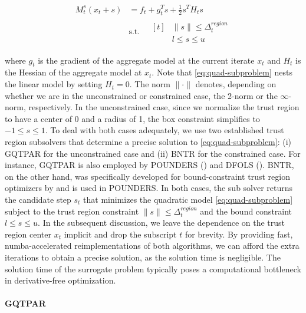 \begin{align}
    M_{t}^{s} (x_t + s) &= f_t + g_t^T s + \frac{1}{2} s^T H_t s \\
    &\text{s.t.} \quad \begin{aligned}[t]
        &\lVert s \rVert \leq \Delta^{region}_{t} \\
        & l \leq s \leq u
    \end{aligned}
    \label{eq:quad-subproblem}
\end{align}


\noindent where $g_t$ is the gradient of the aggregate model at the current iterate $x_t$ and $H_t$ is the Hessian of the aggregate model at $x_t$.
Note that \ref{eq:quad-subproblem} nests the linear model by setting $H_t=0$.
The norm $\lVert\cdot\rVert$ denotes, depending on whether we are in the unconstrained or constrained case, the 2-norm or the $\infty$-norm, respectively. In the unconstrained case, since we normalize the trust region to have a center of 0 and a radius of 1, the box constraint simplifies to $-1 \leq s \leq 1$.
To deal with both cases adequately, we use two established trust region subsolvers that determine a precise solution to \ref{eq:quad-subproblem}: (i) GQTPAR for the unconstrained case and (ii) BNTR for the constrained case. For instance, GQTPAR is also employed by POUNDERS (\cite{Wild2015}) and DFOLS (\cite{dfols2019}). BNTR, on the other hand, was specifically developed for bound-constraint trust region optimizers by \cite{TAO21} and is used in POUNDERS.
\noindent In both cases, the sub solver returns the candidate step $s_t$ that minimizes the quadratic model \ref{eq:quad-subproblem} subject to the trust region constraint $\lVert s \rVert \leq \Delta^{region}_{t}$ and the bound constraint $l \leq s \leq u$.
In the subsequent discussion, we leave the dependence on the trust region center $x_t$ implicit and drop the subscript $t$ for brevity. %
By providing fast, numba-accelerated reimplementations of both algorithms, we can afford the extra iterations to obtain a precise solution, as the solution time is negligible. The solution time of the surrogate problem typically poses a computational bottleneck in derivative-free optimization.


\paragraph{GQTPAR}

